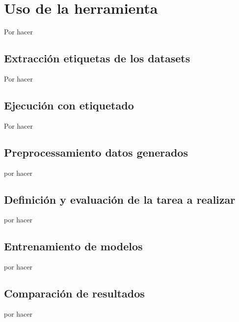 \section{Uso de la herramienta}

Por hacer

\subsection{Extracción etiquetas de los datasets}

Por hacer

\subsection{Ejecución con etiquetado}

Por hacer

\subsection{Preprocessamiento datos generados}

por hacer

\subsection{Definición y evaluación de la tarea a realizar}

por hacer

\subsection{Entrenamiento de modelos}

por hacer

\subsection{Comparación de resultados}

por hacer

